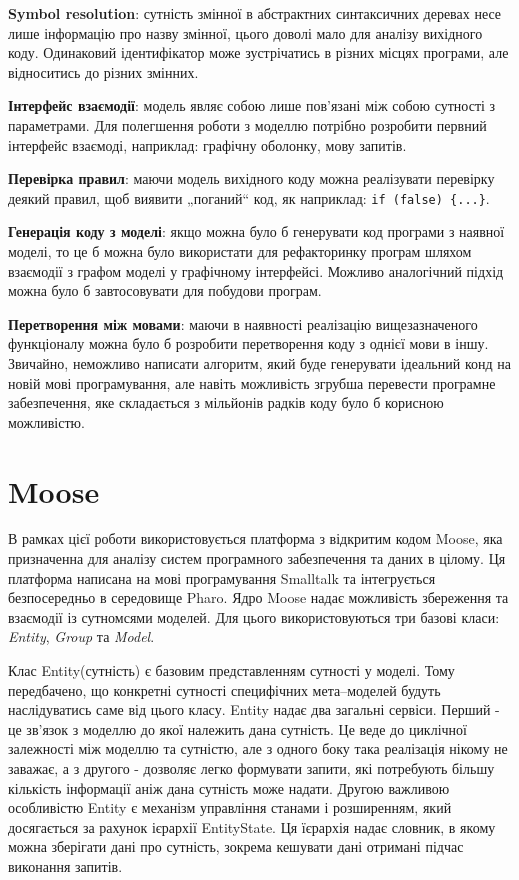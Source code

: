 \documentclass[12pt,a4paper]{article}
\begin{document}
\textbf{Symbol resolution}: сутність змінної в абстрактних синтаксичних деревах несе лише інформацію про назву змінної, цього доволі мало для аналізу вихідного коду. Одинаковий ідентифікатор може зустрічатись в різних місцях програми, але відноситись до різних змінних.

\textbf{Інтерфейс взаємодії}: модель являє собою лише пов'язані між собою сутності з параметрами. Для полегшення роботи з моделлю потрібно розробити первний інтерфейс взаємоді, наприклад: графічну оболонку, мову запитів.

\textbf{Перевірка правил}: маючи модель вихідного коду можна реалізувати перевірку деякий правил, щоб виявити „поганий“ код, як наприклад: \lstinline$if (false) {...}$.

\textbf{Генерація коду з моделі}: якщо можна було б генерувати код програми з наявної моделі, то це б можна було використати для рефакторинку програм шляхом взаємодії з графом моделі у графічному інтерфейсі. Можливо аналогічний підхід можна було б завтосовувати для побудови програм.

\textbf{Перетворення між мовами}: маючи в наявності реалізацію вищезазначеного функціоналу можна було б розробити перетворення коду з однієї мови в іншу. Звичайно, неможливо написати алгоритм, який буде генерувати ідеальний конд на новій мові програмування, але навіть можливість згрубша перевести програмне забезпечення, яке складається з мільйонів радків коду було б корисною можливістю.

\clearpage

\section{Moose}

В рамках цієї роботи використовується платформа з відкритим кодом Moose\cite{moose}, яка призначенна для аналізу систем програмного забезпечення та даних в цілому. Ця платформа написана на мові програмування Smalltalk та інтегрується безпосередньо в середовище Pharo. Ядро Moose надає можливість збереження та взаємодії із сутномсями моделей. Для цього використовуються три базові класи: \emph{Entity}, \emph{Group} та \emph{Model}.

Клас Entity(сутність) є базовим представленням сутності у моделі. Тому передбачено, що конкретні сутності специфічних мета--моделей будуть наслідуватись саме від цього класу. Entity надає два загальні сервіси. Перший - це зв'язок з моделлю до якої належить дана сутність. Це веде до циклічної залежності між моделлю та сутністю, але з одного боку така реалізація нікому не заважає, а з другого - дозволяє легко формувати запити, які потребують більшу кількість інформації аніж дана сутність може надати. Другою важливою особливістю Entity є механізм управління станами і розширенням, який досягається за рахунок ієрархії EntityState. Ця їєрархія надає словник, в якому можна зберігати дані про сутність, зокрема кешувати дані отримані підчас виконання запитів.
\end{document}
